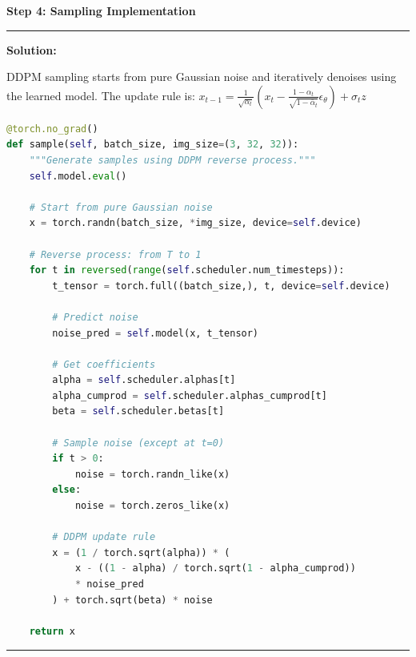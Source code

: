 \documentclass[a4paper,12pt]{article}
\newenvironment{solutionbox}{
    \par
    \vspace{0.5em}
    \noindent
    {\color{primary}\rule{\linewidth}{0.4pt}}
    \par\smallskip
    \noindent\textbf{\color{primary}Solution:}
    \par\smallskip
    \small
}{
    \par\smallskip
    {\color{primary}\rule{\linewidth}{0.4pt}}
    \par\vspace{0.5em}
}
\begin{document}
\textbf{Step 4: Sampling Implementation}
\begin{solutionbox}
    DDPM sampling starts from pure Gaussian noise and iteratively denoises using the learned model. The update rule is: $x_{t-1} = \frac{1}{\sqrt{\alpha_t}}(x_t - \frac{1-\alpha_t}{\sqrt{1-\bar{\alpha}_t}}\epsilon_\theta) + \sigma_t z$
    
\begin{lstlisting}[language=Python]
@torch.no_grad()
def sample(self, batch_size, img_size=(3, 32, 32)):
    """Generate samples using DDPM reverse process."""
    self.model.eval()
    
    # Start from pure Gaussian noise
    x = torch.randn(batch_size, *img_size, device=self.device)
    
    # Reverse process: from T to 1
    for t in reversed(range(self.scheduler.num_timesteps)):
        t_tensor = torch.full((batch_size,), t, device=self.device)
        
        # Predict noise
        noise_pred = self.model(x, t_tensor)
        
        # Get coefficients
        alpha = self.scheduler.alphas[t]
        alpha_cumprod = self.scheduler.alphas_cumprod[t]
        beta = self.scheduler.betas[t]
        
        # Sample noise (except at t=0)
        if t > 0:
            noise = torch.randn_like(x)
        else:
            noise = torch.zeros_like(x)
        
        # DDPM update rule
        x = (1 / torch.sqrt(alpha)) * (
            x - ((1 - alpha) / torch.sqrt(1 - alpha_cumprod)) 
            * noise_pred
        ) + torch.sqrt(beta) * noise
        
    return x
\end{lstlisting}
\end{solutionbox}
\end{document}
